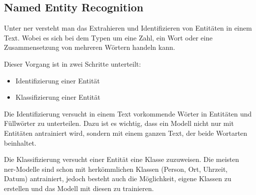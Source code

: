 \subsection{Named Entity Recognition}

Unter \gls{ner} versteht man das Extrahieren und Identifizieren von Entitäten in einem Text. Wobei es sich bei dem Typen um eine Zahl, ein Wort oder eine Zusammensetzung von mehreren Wörtern handeln kann. 

Dieser Vorgang ist in zwei Schritte unterteilt: \cite{NER}

\begin{itemize}
    \item Identifizierung einer Entität
    \item Klassifizierung einer Entität
\end{itemize}

Die Identifizierung versucht in einem Text vorkommende Wörter in Entitäten und Füllwörter zu unterteilen. Dazu ist es wichtig, dass ein Modell nicht nur mit Entitäten antrainiert wird, sondern mit einem ganzen Text, der beide Wortarten beinhaltet. 

Die Klassifizierung versucht einer Entität eine Klasse zuzuweisen. Die meisten \gls{ner}-Modelle sind schon mit herkömmlichen Klassen (Person, Ort, Uhrzeit, Datum) antrainiert, jedoch besteht auch die Möglichkeit, eigene Klassen zu erstellen und das Modell mit diesen zu trainieren. 